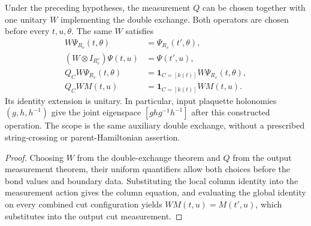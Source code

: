 \begin{lemma}%
    \label{thm:peps_torus_three_plaquette_measured_double_exchange}
    \leanok
    Under the preceding hypotheses, the measurement $Q$ can be chosen
    together with one unitary $W$ implementing the double exchange.
    Both operators are chosen before every $t,u,\theta$. The same $W$ satisfies
    \begin{align}
        W\Psi_{R_v}(t,\theta)         & =\Psi_{R_v}(t',\theta),                    \\
        (W\otimes I_{R_v^c})\Psi(t,u) & =\Psi(t',u),                               \\
        Q_CW\Psi_{R_v}(t,\theta)
                                      & =\mathbf1_{C=[k(t)]}W\Psi_{R_v}(t,\theta), \\
        Q_CWM(t,u)                    & =\mathbf1_{C=[k(t)]}WM(t,u).
    \end{align}
    Its identity extension is unitary. In particular, input plaquette
    holonomies $(g,h,h^{-1})$ give the joint eigenspace
    $[ghg^{-1}h^{-1}]$ after this constructed operation.
    The scope is the same auxiliary double exchange, without a
    prescribed string-crossing or parent-Hamiltonian assertion.
\end{lemma}

\begin{proof}\leanok
    Choosing $W$ from the double-exchange theorem and $Q$ from the
    output measurement theorem, their uniform quantifiers allow both
    choices before the bond values and boundary data. Substituting the local
    column identity into the measurement action gives the column equation, and
    evaluating the global identity on every combined cut configuration yields
    $WM(t,u)=M(t',u)$, which substitutes into the output cut measurement.
\end{proof}
